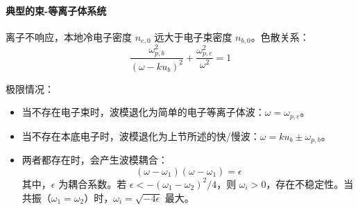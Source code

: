 \paragraph{典型的束-等离子体系统}
离子不响应，本地冷电子密度 $n_{e,0}$ 远大于电子束密度 $n_{b,0}$。色散关系：
\begin{equation}
\frac{\omega_{p,b}^2}{\left( \omega - k u_b \right)^2} + \frac{\omega_{p,e}^2}{\omega^2} = 1
\end{equation}

极限情况：
\begin{itemize}
    \item 当不存在电子束时，波模退化为简单的电子等离子体波：$\omega = \omega_{p,e}$。
    \item 当不存在本底电子时，波模退化为上节所述的快/慢波：$\omega = k u_b \pm \omega_{p,b}$。
    \item 两者都存在时，会产生波模耦合：
\begin{equation}
\left(\omega - \omega_1\right) \left(\omega - \omega_1\right) = \epsilon
\end{equation}
其中，$\epsilon$ 为耦合系数。若 $\epsilon < - (\omega_1 - \omega_2)^2 / 4$，则 $\omega_i > 0$，存在不稳定性。当共振（$\omega_1 = \omega_2$）时，$\omega_i = \sqrt{-4\epsilon}$ 最大。
\end{itemize}

